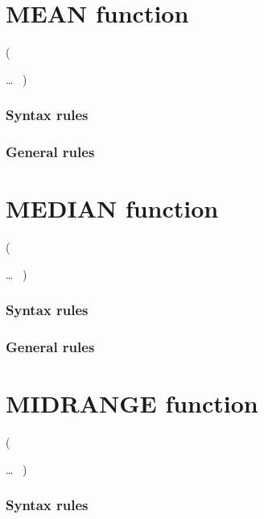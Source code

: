 \section{MEAN function}

\begin{syntax}
    (
  \begin{1=}
    \argument
  \end{1=}\ldots
  \ {})
\end{syntax}

\subsubsection{Syntax rules}

\subsubsection{General rules}

\section{MEDIAN function}

\begin{syntax}
    (
  \begin{1=}
    \argument
  \end{1=}\ldots
  \ {})
\end{syntax}

\subsubsection{Syntax rules}

\subsubsection{General rules}

\section{MIDRANGE function}

\begin{syntax}
    (
  \begin{1=}
    \argument
  \end{1=}\ldots
  \ {})
\end{syntax}

\subsubsection{Syntax rules}

